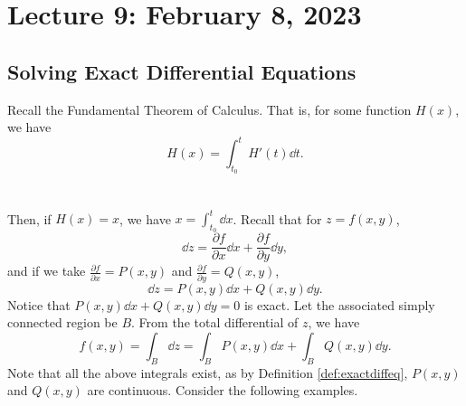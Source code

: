     \pagebreak

\section{Lecture 9: February 8, 2023}

    \subsection{Solving Exact Differential Equations}

        Recall the Fundamental Theorem of Calculus. That is, for some function \(H(x)\), we have
        \begin{equation*}
            H(x)=\int_{t_0}^t H'(t)\dd t.
        \end{equation*}
        \vphantom
        \\
        \\
        Then, if \(H(x)=x\), we have \(x=\int_{t_0}^t \dd x\). Recall that for \(z=f(x,y)\), 
        \begin{equation*}
            \dd z = \frac{\partial f}{\partial x}\dd x+\frac{\partial f}{\partial y} \dd y,
        \end{equation*}
        and if we take \(\frac{\partial f}{\partial x}=P(x,y)\) and \(\frac{\partial f}{\partial y}=Q(x,y)\),
        \begin{equation*}
            \dd z=P(x,y)\dd x+Q(x,y)\dd y.
        \end{equation*}
        Notice that \(P(x,y)\dd x+Q(x,y)\dd y=0\) is exact. Let the associated simply connected region be \(B\). From the total differential of \(z\), we have
        \begin{equation*}
            f(x,y)=\int_B \dd z=\int_B P(x,y)\dd x+\int_B Q(x,y)\dd y.
        \end{equation*}
        Note that all the above integrals exist, as by Definition \ref{def:exactdiffeq}, \(P(x,y)\) and \(Q(x,y)\) are continuous. Consider the following examples.

